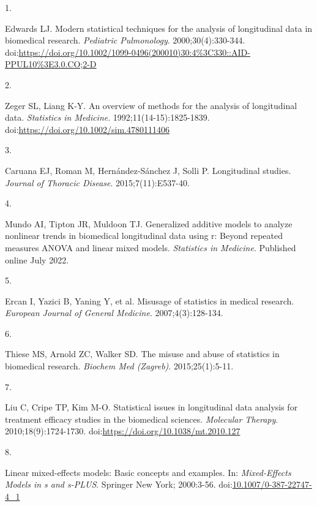 \documentclass[
]{article}
\newlength{\cslhangindent}
\newlength{\csllabelwidth}
\newlength{\cslentryspacingunit} %
\newenvironment{CSLReferences}[2] %
 {%
  \setlength{\parindent}{0pt}
  \ifodd #1
  \let\oldpar\par
  \def\par{\hangindent=\cslhangindent\oldpar}
  \fi
  \setlength{\parskip}{#2\cslentryspacingunit}
 }%
 {}
\newcommand{\CSLLeftMargin}[1]{\parbox[t]{\csllabelwidth}{#1}}
\newcommand{\CSLRightInline}[1]{\parbox[t]{\linewidth - \csllabelwidth}{#1}\break}
\begin{document}
\hypertarget{refs}{}
\begin{CSLReferences}{0}{0}
\leavevmode{}%
\CSLLeftMargin{1. }%
\CSLRightInline{Edwards LJ. Modern statistical techniques for the
analysis of longitudinal data in biomedical research. \emph{Pediatric
Pulmonology}. 2000;30(4):330-344.
doi:\url{https://doi.org/10.1002/1099-0496(200010)30:4\%3C330::AID-PPUL10\%3E3.0.CO;2-D}}

\leavevmode{}%
\CSLLeftMargin{2. }%
\CSLRightInline{Zeger SL, Liang K-Y. An overview of methods for the
analysis of longitudinal data. \emph{Statistics in Medicine}.
1992;11(14-15):1825-1839.
doi:\url{https://doi.org/10.1002/sim.4780111406}}

\leavevmode{}%
\CSLLeftMargin{3. }%
\CSLRightInline{Caruana EJ, Roman M, Hernández-Sánchez J, Solli P.
Longitudinal studies. \emph{Journal of Thoracic Disease}.
2015;7(11):E537-40.}

\leavevmode{}%
\CSLLeftMargin{4. }%
\CSLRightInline{Mundo AI, Tipton JR, Muldoon TJ. Generalized additive
models to analyze nonlinear trends in biomedical longitudinal data using
r: Beyond repeated measures {ANOVA} and linear mixed models.
\emph{Statistics in Medicine}. Published online July 2022.}

\leavevmode{}%
\CSLLeftMargin{5. }%
\CSLRightInline{Ercan I, Yazici B, Yaning Y, et al. Misusage of
statistics in medical research. \emph{European Journal of General
Medicine}. 2007;4(3):128-134.}

\leavevmode{}%
\CSLLeftMargin{6. }%
\CSLRightInline{Thiese MS, Arnold ZC, Walker SD. The misuse and abuse of
statistics in biomedical research. \emph{Biochem Med (Zagreb)}.
2015;25(1):5-11.}

\leavevmode{}%
\CSLLeftMargin{7. }%
\CSLRightInline{Liu C, Cripe TP, Kim M-O. Statistical issues in
longitudinal data analysis for treatment efficacy studies in the
biomedical sciences. \emph{Molecular Therapy}. 2010;18(9):1724-1730.
doi:\url{https://doi.org/10.1038/mt.2010.127}}

\leavevmode{}%
\CSLLeftMargin{8. }%
\CSLRightInline{Linear mixed-effects models: Basic concepts and
examples. In: \emph{Mixed-Effects Models in s and s-PLUS}. Springer New
York; 2000:3-56.
doi:\href{https://doi.org/10.1007/0-387-22747-4_1}{10.1007/0-387-22747-4\_1}}


\end{CSLReferences}
\end{document}
